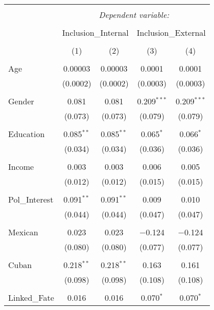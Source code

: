 
\begin{table}[!htbp] \centering 
  \caption{} 
  \label{} 
\begin{tabular}{@{\extracolsep{5pt}}lcccc} 
\\[-1.8ex]\hline 
\hline \\[-1.8ex] 
 & \multicolumn{4}{c}{\textit{Dependent variable:}} \\ 
\cline{2-5} 
\\[-1.8ex] & \multicolumn{2}{c}{Inclusion\_Internal} & \multicolumn{2}{c}{Inclusion\_External} \\ 
\\[-1.8ex] & (1) & (2) & (3) & (4)\\ 
\hline \\[-1.8ex] 
 Age & 0.00003 & 0.00003 & 0.0001 & 0.0001 \\ 
  & (0.0002) & (0.0002) & (0.0003) & (0.0003) \\ 
  & & & & \\ 
 Gender & 0.081 & 0.081 & 0.209$^{***}$ & 0.209$^{***}$ \\ 
  & (0.073) & (0.073) & (0.079) & (0.079) \\ 
  & & & & \\ 
 Education & 0.085$^{**}$ & 0.085$^{**}$ & 0.065$^{*}$ & 0.066$^{*}$ \\ 
  & (0.034) & (0.034) & (0.036) & (0.036) \\ 
  & & & & \\ 
 Income & 0.003 & 0.003 & 0.006 & 0.005 \\ 
  & (0.012) & (0.012) & (0.015) & (0.015) \\ 
  & & & & \\ 
 Pol\_Interest & 0.091$^{**}$ & 0.091$^{**}$ & 0.009 & 0.010 \\ 
  & (0.044) & (0.044) & (0.047) & (0.047) \\ 
  & & & & \\ 
 Mexican & 0.023 & 0.023 & $-$0.124 & $-$0.124 \\ 
  & (0.080) & (0.080) & (0.077) & (0.077) \\ 
  & & & & \\ 
 Cuban & 0.218$^{**}$ & 0.218$^{**}$ & 0.163 & 0.161 \\ 
  & (0.098) & (0.098) & (0.108) & (0.108) \\ 
  & & & & \\ 
 Linked\_Fate & 0.016 & 0.016 & 0.070$^{*}$ & 0.070$^{*}$ \\ 

\end{tabular}
\end{table}
